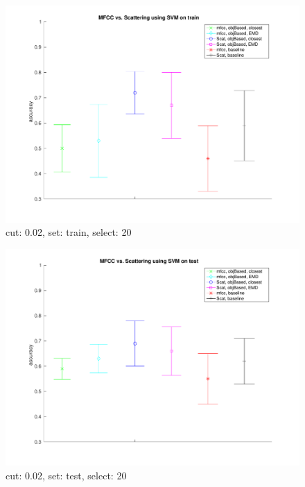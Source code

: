   
\begin{center} 
\begin{figure} 
\centering 
\includegraphics[width=\textwidth,height=0.8\textheight,keepaspectratio]{./figures/Fig5.pdf} 
\caption{cut: 0.02, set: train, select: 20} 
\label{cut0.02SettrSel20} 
\end{figure} 
\end{center} 
  
  
  
\begin{center} 
\begin{figure} 
\centering 
\includegraphics[width=\textwidth,height=0.8\textheight,keepaspectratio]{./figures/Fig6.pdf} 
\caption{cut: 0.02, set: test, select: 20} 
\label{cut0.02SetteSel20} 
\end{figure} 
\end{center} 
  
  
